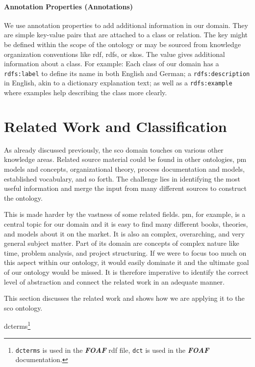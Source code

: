 \documentclass[a4paper, DIV=13, BCOR=0cm]{scrbook}
\newcommand{\prop}[1]{\texttt{#1}}
\newcommand{\pn}[1]{\textit{\textbf{#1}}}
\begin{document}
\paragraph{Annotation Properties (Annotations)}
\label{annotation-properties}
We use annotation properties to add additional information in our domain. They are simple key-value pairs that are attached to a class or relation. The key might be defined within the scope of the ontology or may be sourced from knowledge organization conventions like \gls{rdf}, \gls{rdfs}, or \gls{skos}. The value gives additional information about a class. For example: Each class of our domain has a \prop{rdfs:label} to define its name in both English and German; a \prop{rdfs:description} in English, akin to a dictionary explanation text; as well as a \prop{rdfs:example} where examples help describing the class more clearly.



\section{Related Work and Classification}
\label{related-work}
As already discussed previously, the \gls{sco} domain touches on various other knowledge areas. Related source material could be found in other ontologies, \gls{pm} models and concepts, organizational theory, process documentation and models, established vocabulary, and so forth. The challenge lies in identifying the most useful information and merge the input from many different sources to construct the ontology.

This is made harder by the vastness of some related fields. \gls{pm}, for example, is a central topic for our domain and it is easy to find many different books, theories, and models about it on the market. It is also an complex, overarching, and very general subject matter. Part of its domain are concepts of complex nature like time, problem analysis, and project structuring. If we were to focus too much on this aspect within our ontology, it would easily dominate it and the ultimate goal of our ontology would be  missed. It is therefore imperative to identify the correct level of abstraction and connect the related work in an adequate manner.

This section discusses the related work and shows how we are applying it to the \gls{sco} ontology.



dcterms\footnote{\texttt{dcterms} is used in the \pn{FOAF} rdf file, \texttt{dct} is used in the \pn{FOAF} documentation.}
\end{document}
